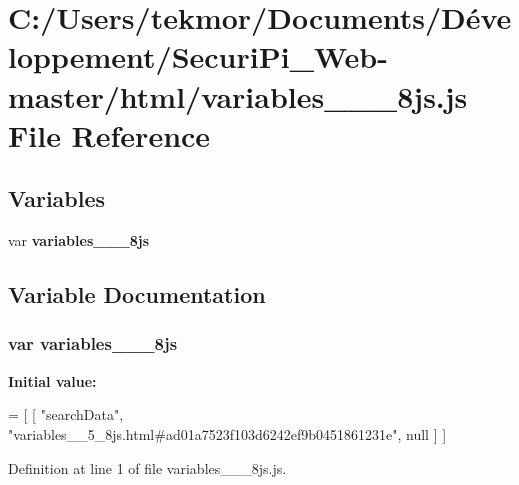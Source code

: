 \section{C\+:/\+Users/tekmor/\+Documents/\+Développement/\+Securi\+Pi\+\_\+\+Web-\/master/html/variables\+\_\+\+\_\+\_\+8js.js File Reference}
\label{variables____5__8js_8js}
\subsection*{Variables}
\begin{DoxyCompactItemize}
\item 
var {\bf variables\+\_\+\+\_\+\_\+8js}
\end{DoxyCompactItemize}


\subsection{Variable Documentation}
\subsubsection[{variables\+\_\+\+\_\+5\+\_\+8js}]{\setlength{\rightskip}{0pt plus 5cm}var variables\+\_\+\+\_\+\_\+8js}\label{variables____5__8js_8js_a5a955195d0efb3cc11e5f08db82fe276}
{\bfseries Initial value\+:}
\begin{DoxyCode}
=
[
    [ \textcolor{stringliteral}{"searchData"}, \textcolor{stringliteral}{"variables\_\_5\_8js.html#ad01a7523f103d6242ef9b0451861231e"}, null ]
]
\end{DoxyCode}


Definition at line 1 of file variables\+\_\+\+\_\+\_\+8js.\+js.

